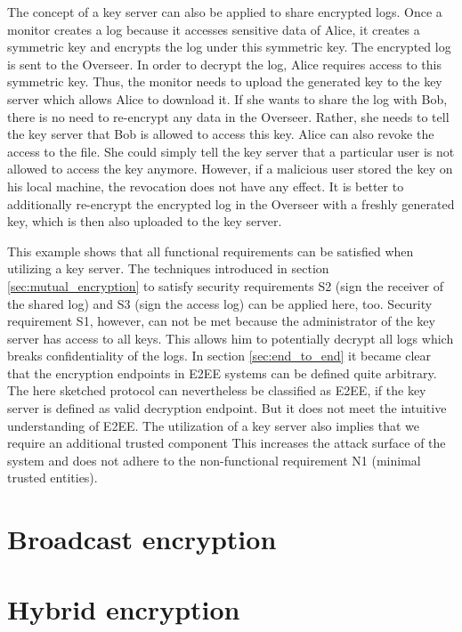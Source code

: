\documentclass[../main.txt]{subfiles}
\begin{document}
The concept of a key server can also be applied to share encrypted logs.
Once a monitor creates a log because it accesses sensitive data of Alice, it creates a symmetric key and encrypts the log under this symmetric key.
The encrypted log is sent to the Overseer.
In order to decrypt the log, Alice requires access to this symmetric key.
Thus, the monitor needs to upload the generated key to the key server which allows Alice to download it.
If she wants to share the log with Bob, there is no need to re-encrypt any data in the Overseer.
Rather, she needs to tell the key server that Bob is allowed to access this key.
Alice can also revoke the access to the file.
She could simply tell the key server that a particular user is not allowed to access the key anymore.
However, if a malicious user stored the key on his local machine, the revocation does not have any effect.
It is better to additionally re-encrypt the encrypted log in the Overseer with a freshly generated key, which is then also uploaded to the key server.

This example shows that all functional requirements can be satisfied when utilizing a key server.
The techniques introduced in section \ref{sec:mutual_encryption} to satisfy security requirements S2 (sign the receiver of the shared log) and S3 (sign the access log) can be applied here, too.
Security requirement S1, however, can not be met because the administrator of the key server has access to all keys.
This allows him to potentially decrypt all logs which breaks confidentiality of the logs.
In section \ref{sec:end_to_end} it became clear that the encryption endpoints in E2EE systems can be defined quite arbitrary.
The here sketched protocol can nevertheless be classified as E2EE, if the key server is defined as valid decryption endpoint.
But it does not meet the intuitive understanding of E2EE.
The utilization of a key server also implies that we require an additional trusted component
This increases the attack surface of the system and does not adhere to the non-functional requirement N1 (minimal trusted entities). 







\section{Broadcast encryption}
\section{Hybrid encryption}
\end{document}
